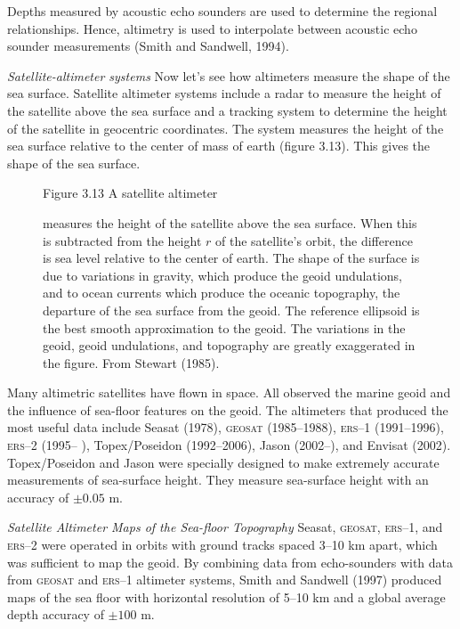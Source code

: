 Depths measured by acoustic echo sounders are used to determine the regional
relationships. Hence, altimetry is used to interpolate between acoustic echo
sounder measurements (Smith and Sandwell, 1994).

\textit{Satellite-altimeter systems} Now
let's see how altimeters measure the shape of the sea surface. Satellite
altimeter systems include a radar to measure the height of the satellite above the
sea surface and a tracking system to determine the height of the satellite in
geocentric coordinates. The system measures the height of the sea surface relative
to the center of mass of earth (figure 3.13). This gives the shape of the sea
surface.

\begin{figure}[t!]
\footnotesize
Figure 3.13 A satellite altimeter \rule{0mm}{3ex}measures the height
of the satellite above the sea surface. When this is subtracted from the height
$r$ of the satellite's orbit, the difference is sea level relative to the center
of earth. The shape of the surface is due to variations in gravity, which
produce the geoid undulations, and to ocean currents which produce the oceanic topography, the departure of the sea surface from the geoid. The reference
ellipsoid is the best smooth approximation to the geoid. The variations in the geoid, geoid
undulations, and topography are greatly exaggerated in the figure. From Stewart (1985).
\label{fig:altimetersketch}
\vspace{-4ex}
\end{figure}

Many altimetric satellites have flown in space. All observed the marine geoid and the influence of sea-floor features on the geoid. The altimeters that produced the most useful data include Seasat (1978),
\textsc{geosat} (1985--1988), \textsc{ers}--1 (1991--1996),
\textsc{ers}--2 (1995-- ), Topex/Poseidon (1992--2006), Jason (2002--), and Envisat (2002).
Topex/Poseidon and Jason were specially designed to make extremely accurate measurements of sea-surface height. They measure sea-surface height with an accuracy of $\pm 0.05$ m.

\textit{Satellite Altimeter Maps of the Sea-floor Topography} Seasat, \textsc{geosat}, \textsc{ers}--1,
and \textsc{ers}--2 were operated in orbits with ground tracks spaced 3--10 km apart, which was sufficient to map the
geoid. By combining data from echo-sounders with data from \textsc{geosat} and \textsc{ers}--1 altimeter systems, Smith and Sandwell (1997) produced maps of the sea floor with horizontal resolution of 5--10 km and a global average depth accuracy of $\pm 100$ m.

